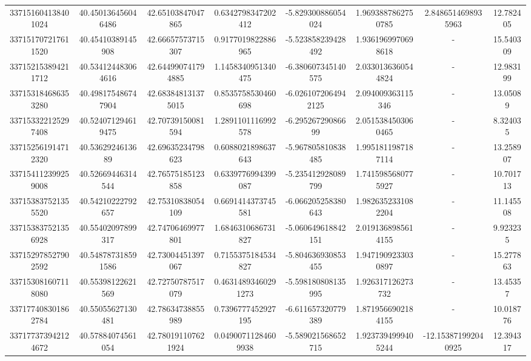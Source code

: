 \documentclass{article}
\begin{document}
\begin{landscape}
\begin{longtable}[c]{S[table-format=18.0]S[table-format=2.15]S[table-format=2.15]S[table-format=-2.17]S[table-format=-2.16]S[table-format=-2.16]S[table-format=-3.16]S[table-format=2.7]}
337151604138401024 & 40.450136456046486 & 42.65103847047865  & 0.6342798347202412    & -5.829300886054024  & 1.9693887862750785 & 2.8486514698935963  & 12.782405  \\
337151707217611520 & 40.45410389145908  & 42.66657573715307  & 0.9177019822886965    & -5.523858239428492  & 1.9361969970698618 & {-}                  & 15.540309  \\
337152153894211712 & 40.534124483064616 & 42.644990741794885 & 1.1458340951340475    & -6.380607345140575  & 2.0330136360544824 & {-}                  & 12.983199  \\
337153184686353280 & 40.498175486747904 & 42.683848131375015 & 0.8535758530460698    & -6.0261072064942125 & 2.094009363115346  & {-}                  & 13.05089   \\
337153322125297408 & 40.524071294619475 & 42.70739150081594  & 1.2891101116992578    & -6.29526729086699   & 2.0515384503060465 & {-}                  & 8.324035   \\
337152561914712320 & 40.5362924613689   & 42.69635234798623  & 0.6088021898637643    & -5.967805810838485  & 1.9951811987187114 & {-}                  & 13.258907  \\
337154112399259008 & 40.52669446314544  & 42.76575185123858  & 0.6339776994399087    & -5.235412928089799  & 1.7415985680775927 & {-}                  & 10.701713  \\
337153837521355520 & 40.54210222792657  & 42.75310838054109  & 0.6691414373745581    & -6.066205258380643  & 1.9826352331082204 & {-}                  & 11.145508  \\
337153837521356928 & 40.55402097899317  & 42.74706469977801  & 1.6846310686731827    & -5.060649618842151  & 2.0191368985614155 & {-}                  & 9.923235   \\
337152978527902592 & 40.548787318591586 & 42.73004451397067  & 0.7155375184534827    & -5.804636930853455  & 1.9471909233030897 & {-}                  & 15.277863  \\
337153081607118080 & 40.55398122621569  & 42.72750787517079  & 0.46314893460291273   & -5.598180808135995  & 1.926317126273732  & {-}                  & 13.45357   \\
337177408301862784 & 40.55055627130481  & 42.78634738855989  & 0.7396777452927195    & -6.611657320779389  & 1.8719566902184155 & {-}                  & 10.018776  \\
337177373942124672 & 40.57884074561054  & 42.780191107621924 & 0.04900711284609938   & -5.589021568652715  & 1.9237394999405244 & -12.153871992040925 & 12.394317  \\

\end{longtable}
\end{landscape}
\end{document}
